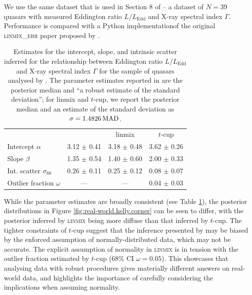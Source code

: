 \documentclass[fleqn,usenatbib]{rasti}
\begin{document}
We use the same dataset that is used in Section 8 of \citet{Kelly:2007} -- a
dataset of $N = 39$ quasars with measured Eddington ratio $L / L_{\text{Edd}}$
and X-ray spectral index $\Gamma$. Performance is compared with a Python
implementation\footnotemark of the original \textsc{linmix\_err} paper proposed
by \citeauthor{Kelly:2007}.


\begin{table}
	\centering
	\caption{Estimates for the intercept,
    slope, and intrinsic scatter inferred for the relationship between Eddington
    ratio $L / L_{\text{Edd}}$ and X-ray spectral index $\Gamma$ for the sample of quasars analysed by \citet{Kelly:2007}. The parameter
    estimates reported in \citet{Kelly:2007} are the posterior median and ``a
    robust estimate of the standard deviation''; for linmix and $t$-cup, we
    report the posterior median and an estimate of the standard deviation as
    $\sigma = 1.4826 \, {\rm MAD}$.}
	\label{tab:real-world.kelly.params}
	\begin{tabular}{lccc} %
                               & \citet{Kelly:2007} & linmix   & $t$-cup       \\
    Intercept $\alpha$         & 3.12 $\pm$ 0.41 & 3.18 $\pm$ 0.48 & 3.62 $\pm$ 0.26 \\
    Slope $\beta$              & 1.35 $\pm$ 0.54 & 1.40 $\pm$ 0.60 & 2.00 $\pm$ 0.33 \\
    Int. scatter $\sigma_{68}$ & 0.26 $\pm$ 0.11 & 0.25 $\pm$ 0.12 & 0.08 $\pm$ 0.07 \\
    Outlier fraction $\omega$  &      ---      &      ---      & 0.04 $\pm$ 0.03 \\
\end{tabular}
\end{table}

While the parameter estimates are broadly consistent (see Table
\ref{tab:real-world.kelly.params}), the posterior distributions in Figure
\ref{fig:real-world.kelly.corner} can be seen to differ, with the posterior
inferred by \textsc{linmix} being more diffuse than that inferred by $t$-cup.
The tighter constraints of $t$-cup suggest that the inference presented by
\citet{Kelly:2007} may be biased by the enforced assumption of normally-distributed data,
which may not be accurate.
The explicit assumption of normality in \textsc{linmix} is in tension with the
outlier fraction estimated by $t$-cup (68\% CI $\omega =
0.05$). This showcases that analysing
data with robust procedures gives materially different answers on real-world
data, and highlights the importance of carefully considering the implications
when assuming normality.
\end{document}
